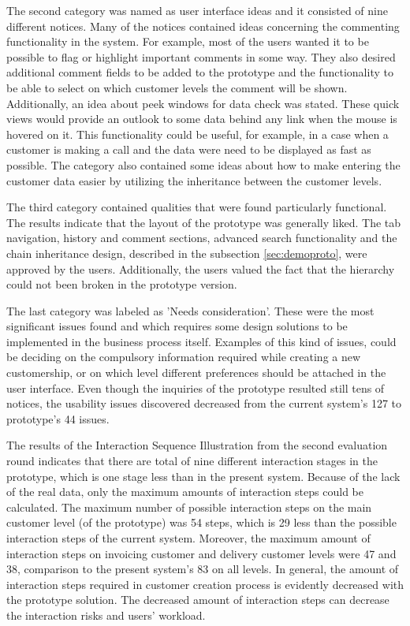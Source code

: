 \documentclass[12pt,a4paper,oneside,pdftex]{report}
\begin{document}
The second category was named as user interface ideas and it consisted of nine different notices. Many of the notices contained ideas concerning the commenting functionality in the system. For example, most of the users wanted it to be possible to flag or highlight important comments in some way. They also desired additional comment fields to be added to the prototype and the functionality to be able to select on which customer levels the comment will be shown. Additionally, an idea about peek windows for data check was stated. These quick views would provide an outlook to some data behind any link when the mouse is hovered on it. This functionality could be useful, for example, in a case when a customer is making a call and the data were need to be displayed as fast as possible. The category also contained some ideas about how to make entering the customer data easier by utilizing the inheritance between the customer levels. 

The third category contained qualities that were found particularly functional. The results indicate that the layout of the prototype was generally liked. The tab navigation, history and comment sections, advanced search functionality and the chain inheritance design, described in the subsection \ref{sec:demoproto}, were approved by the users. Additionally, the users valued the fact that the hierarchy could not been broken in the prototype version. 

The last category was labeled as 'Needs consideration'. These were the most significant issues found and which requires some design solutions to be implemented in the business process itself. Examples of this kind of issues, could be deciding on the compulsory information required while creating a new customership, or on which level different preferences should be attached in the user interface. Even though the inquiries of the prototype resulted still tens of notices, the usability issues discovered decreased from the current system's 127 to prototype's 44 issues. 

The results of the Interaction Sequence Illustration from the second evaluation round indicates that there are total of nine different interaction stages in the prototype, which is one stage less than in the present system. Because of the lack of the real data, only the maximum amounts of interaction steps could be calculated. The maximum number of possible interaction steps on the main customer level (of the prototype) was 54 steps, which is  29 less than the possible interaction steps of the current system. Moreover, the maximum amount of interaction steps on invoicing customer and delivery customer levels were 47 and 38, comparison to the present system's 83 on all levels. In general, the amount of interaction steps required in customer creation process is evidently decreased with the prototype solution. The decreased amount of interaction steps can decrease the interaction risks and users' workload.
\end{document}
